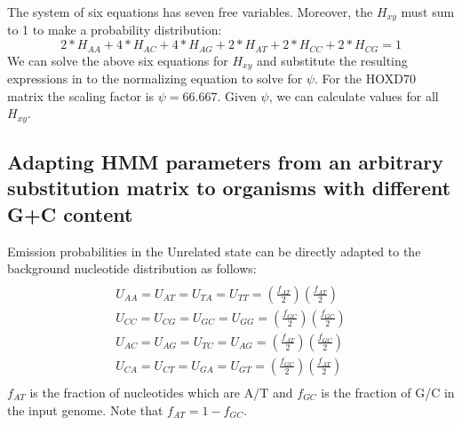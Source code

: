 The system of six equations has seven free variables.  Moreover, the $H_{xy}$ must sum to 1 to make a probability distribution:
\begin{equation}
2*H_{AA} + 4*H_{AC} + 4*H_{AG} + 2*H_{AT} + 2*H_{CC} + 2*H_{CG} = 1
\end{equation}
We can solve the above six equations for $H_{xy}$ and substitute the
resulting expressions in to the normalizing equation to solve for
$\psi$. For the HOXD70 matrix the scaling factor is $\psi=66.667$. Given
$\psi$, we can calculate values for all $H_{xy}$.


\subsection{Adapting HMM parameters from an arbitrary substitution matrix to organisms with different G+C content}
Emission
probabilities in the Unrelated state can be directly adapted to the
background nucleotide distribution as follows:
\begin{multline}\\
U_{AA}=U_{AT}=U_{TA}=U_{TT}=(\frac{f_{AT}}{2})(\frac{f_{AT}}{2})\\
U_{CC}=U_{CG}=U_{GC}=U_{GG}=(\frac{f_{GC}}{2})(\frac{f_{GC}}{2})\\
U_{AC}=U_{AG}=U_{TC}=U_{AG}=(\frac{f_{AT}}{2})(\frac{f_{GC}}{2})\\
U_{CA}=U_{CT}=U_{GA}=U_{GT}=(\frac{f_{GC}}{2})(\frac{f_{AT}}{2})\\
\end{multline}
$f_{AT}$ is the fraction of nucleotides which are A/T and
$f_{GC}$ is the fraction of G/C in the input genome.  Note that $f_{AT}=1-f_{GC}$.

